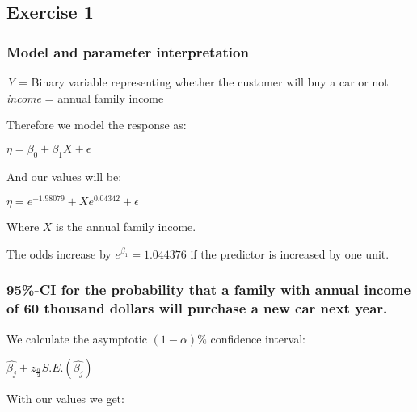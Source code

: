 \documentclass[]{article}
\begin{document}
\newpage

\hypertarget{exercise-1}{%
\subsection{Exercise 1}\label{exercise-1}}

\hypertarget{model-and-parameter-interpretation}{%
\subsubsection{Model and parameter
interpretation}\label{model-and-parameter-interpretation}}

\emph{Y} = Binary variable representing whether the customer will buy a
car or not \emph{income} = annual family income

Therefore we model the response as:

\(\eta = \beta_{0} + \beta_{1} X + \epsilon\)

And our values will be:

\(\eta = e^{-1.98079} + X e^{0.04342} + \epsilon\)

Where \(X\) is the annual family income.

The odds increase by \(e^{\beta_{1}} = 1.044376\) if the predictor is
increased by one unit.

\hypertarget{ci-for-the-probability-that-a-family-with-annual-income-of-60-thousand-dollars-will-purchase-a-new-car-next-year.}{%
\subsubsection{95\%-CI for the probability that a family with annual
income of 60 thousand dollars will purchase a new car next
year.}\label{ci-for-the-probability-that-a-family-with-annual-income-of-60-thousand-dollars-will-purchase-a-new-car-next-year.}}

We calculate the asymptotic \((1 - \alpha)\%\) confidence interval:

\(\hat{\beta_{j}} \pm z_{\frac{\alpha}{2}} S.E. (\hat{\beta_{j}})\)

With our values we get:
\end{document}
